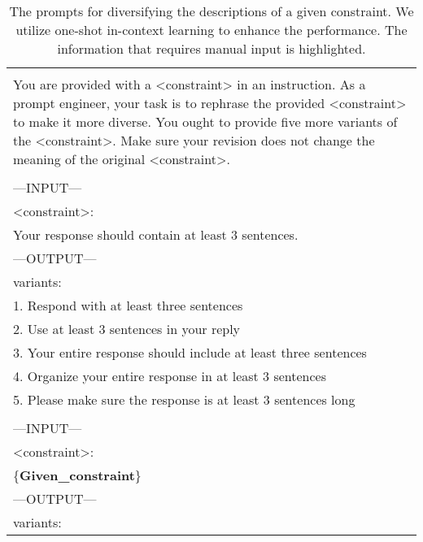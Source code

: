 \begin{table*}[t]
\small
    \begin{tabularx}{\linewidth}{X}
    \toprule
    \color{gray}{/* \textit{Task prompt} */}\\
    You are provided with a <constraint> in an instruction. As a prompt engineer, your task is to rephrase the provided <constraint> to make it more diverse. You ought to provide five more variants of the <constraint>. Make sure your revision does not change the meaning of the original <constraint>. \\
    \color{gray}{/* \textit{Example} */}\\
    ---INPUT--- \\
    <constraint>:\\
    Your response should contain at least 3 sentences.\\
    ---OUTPUT---\\
    variants:\\
    1. Respond with at least three sentences\\
    2. Use at least 3 sentences in your reply\\
    3. Your entire response should include at least three sentences\\
    4. Organize your entire response in at least 3 sentences\\
    5. Please make sure the response is at least 3 sentences long\\
    \color{gray}{/* \textit{Input} */}\\
    ---INPUT---\\
    <constraint>:\\
    \{\textbf{Given\_constraint}\}\\
    ---OUTPUT---\\
    variants:\\
    \bottomrule
    \end{tabularx}
  \caption{
    The prompts for diversifying the descriptions of a given constraint. We utilize one-shot in-context learning to enhance the performance. The information that requires manual input is highlighted.
  }
  \label{tab:100diverse}
\end{table*}

